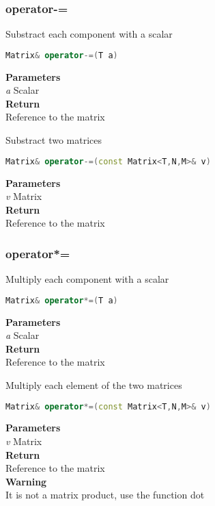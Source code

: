 \subsubsection{operator-=}
\begin{mdframed}
Substract each component with a scalar
\begin{lstlisting}[language=C++]
Matrix& operator-=(T a)
\end{lstlisting}
\textbf{Parameters} \\ 
\textit{a} Scalar \\ 
\textbf{Return} \\ 
Reference to the matrix\\ 
\end{mdframed}

\begin{mdframed}
Substract two matrices
\begin{lstlisting}[language=C++]
Matrix& operator-=(const Matrix<T,N,M>& v)
\end{lstlisting}
\textbf{Parameters} \\ 
\textit{v} Matrix \\ 
\textbf{Return} \\ 
Reference to the matrix\\ 
\end{mdframed}

\subsubsection{operator*=}
\begin{mdframed}
Multiply each component with a scalar
\begin{lstlisting}[language=C++]
Matrix& operator*=(T a)
\end{lstlisting}
\textbf{Parameters} \\ 
\textit{a} Scalar \\ 
\textbf{Return} \\ 
Reference to the matrix\\ 
\end{mdframed}

\begin{mdframed}
Multiply each element of the two matrices
\begin{lstlisting}[language=C++]
Matrix& operator*=(const Matrix<T,N,M>& v)
\end{lstlisting}
\textbf{Parameters} \\ 
\textit{v} Matrix \\ 
\textbf{Return} \\ 
Reference to the matrix\\ 
\textbf{Warning} \\ 
It is not a matrix product, use the function dot\\ 
\end{mdframed}


